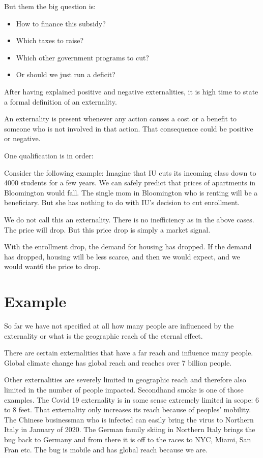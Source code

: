 \documentclass[
]{book}
\providecommand{\tightlist}{%
  \setlength{\itemsep}{0pt}\setlength{\parskip}{0pt}}
\begin{document}
But them the big question is:

\begin{itemize}
\tightlist
\item
  How to finance this subsidy?
\item
  Which taxes to raise?
\item
  Which other government programs to cut?
\item
  Or should we just run a deficit?
\end{itemize}

After having explained positive and negative externalities, it is high time to state a formal definition of an externality.

An externality is present whenever any action causes a cost or a benefit to someone who is not involved in that action. That consequence could be positive or negative.

One qualification is in order:

Consider the following example: Imagine that IU cuts its incoming class down to 4000 students for a few years. We can safely predict that prices of apartments in Bloomington would fall. The single mom in Bloomington who is renting will be a beneficiary. But she has nothing to do with IU's decision to cut enrollment.

We do not call this an externality. There is no inefficiency as in the above cases. The price will drop. But this price drop is simply a market signal.

With the enrollment drop, the demand for housing has dropped. If the demand has dropped, housing will be less scarce, and then we would expect, and we would want6 the price to drop.

\hypertarget{example}{%
\section{Example}\label{example}}

So far we have not specified at all how many people are influenced by the externality or what is the geographic reach of the eternal effect.

There are certain externalities that have a far reach and influence many people. Global climate change has global reach and reaches over 7 billion people.

Other externalities are severely limited in geographic reach and therefore also limited in the number of people impacted. Secondhand smoke is one of those examples. The Covid 19 externality is in some sense extremely limited in scope: 6 to 8 feet. That externality only increases its reach because of peoples' mobility. The Chinese businessman who is infected can easily bring the virus to Northern Italy in January of 2020. The German family skiing in Northern Italy brings the bug back to Germany and from there it is off to the races to NYC, Miami, San Fran etc. The bug is mobile and has global reach because we are.
\end{document}

